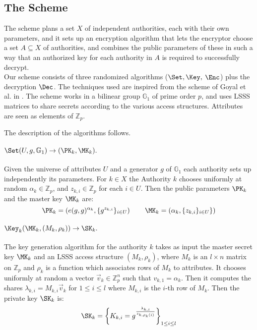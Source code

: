 \subsection{The Scheme}
  The scheme plans a set $X$ of independent authorities, each with their own pa\-ra\-me\-ters, and it sets up an encryption algorithm that lets the encryptor choose a set $A \subseteq X$ of authorities, and combines the public parameters of these in such a way that an authorized key for each authority in $A$ is required to successfully decrypt.\\
  Our scheme consists of three randomized algorithms ($\Set, \Key,$ $\Enc$) plus the decryption $\Dec$.
  The techniques used are inspired from the scheme of Goyal et al. in \cite{goyal2006attribute}.
  The scheme works in a bilinear group $\mathbb{G}_1$ of prime order $p$, and uses LSSS matrices to share secrets according to the various access structures.
  Attributes are seen as elements of $\mathbb{Z}_p$.

  The description of the algorithms follows.

  \paragraph*{$\Set (U, g, \mathbb{G}_1) \rightarrow (\PK_k, \MK_k).$}
    Given the universe of attributes $U$ and a generator $g$ of $\mathbb{G}_1$ each authority sets up independently its parameters.
    For $k \in X$ the Authority $k$ chooses uniformly at random $\alpha_k \in \mathbb{Z}_p$, and $z_{k, i} \in \mathbb{Z}_p$ for each $i \in U$.
    Then the public parameters $\PK_k$ and the master key $\MK_k$ are:
    $$
      \PK_k = \left(e(g,g)^{\alpha_k}, \{g^{z_{k, i}}\}_{i \in U} \right) \qquad \MK_k = \left(\alpha_k, \{z_{k, i}\}_{i \in U}\} \right)
    $$

  \paragraph*{$\Key_k(\MK_k, (M_k, \rho_k)) \rightarrow \SK_k.$}
    The key generation algorithm for the authority $k$ takes as input the master secret key $\MK_k$ and an LSSS access structure $(M_k, \rho_k)$, where $M_k$ is an $l\times n$ matrix on $\mathbb{Z}_p$ and $\rho_k$ is a function which associates rows of $M_k$ to attributes.
    It chooses uniformly at random a vector $\vec{v}_k \in \mathbb{Z}_p^n$ such that $v_{k,1} = \alpha_k$.
    Then it computes the shares $\lambda_{k,i} = M_{k,i} \vec{v}_k$ for $1 \leq i \leq l$ where $M_{k, i}$ is the $i$-th row of $M_k$.
    Then the private key $\SK_k$ is:
    $$
      \SK_k = \left\{K_{k, i} = g^{\frac{\lambda_{k,i}}{z_{k, \rho_{k}(i)}}}\right\}_{1\leq i \leq l}
    $$

